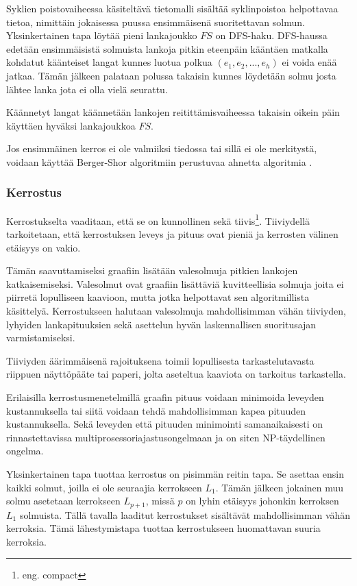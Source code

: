 \documentclass[finnish,12pt]{article}
\begin{document}
Syklien poistovaiheessa käsiteltävä tietomalli sisältää syklinpoistoa helpottavaa tietoa, nimittäin jokaisessa puussa ensimmäisenä suoritettavan solmun.
Yksinkertainen tapa löytää pieni lankajoukko $FS$ on DFS-haku.
DFS-haussa edetään ensimmäisistä solmuista lankoja pitkin eteenpäin kääntäen matkalla kohdatut käänteiset langat kunnes luotua polkua $(e_1,e_2, ..., e_h)$ ei voida enää jatkaa.
Tämän jälkeen palataan polussa takaisin kunnes löydetään solmu josta lähtee lanka jota ei olla vielä seurattu.
\cite{RefWorks:69}

Käännetyt langat käännetään lankojen reitittämisvaiheessa takaisin oikein päin käyttäen hyväksi lankajoukkoa $FS$.

Jos ensimmäinen kerros ei ole valmiiksi tiedossa tai sillä ei ole merkitystä, voidaan käyttää Berger-Shor algoritmiin \cite{RefWorks:68} perustuvaa ahnetta algoritmia \cite{RefWorks:48}.

		\subsubsection{Kerrostus}

Kerrostukselta vaaditaan, että se on kunnollinen sekä tiivis\footnote{eng. compact}.
Tiiviydellä tarkoitetaan, että kerrostuksen leveys ja pituus ovat pieniä ja kerrosten välinen etäisyys on vakio. 

Tämän saavuttamiseksi graafiin lisätään valesolmuja pitkien lankojen katkaisemiseksi.
Valesolmut ovat graafiin lisättäviä kuvitteellisia solmuja joita ei piirretä lopulliseen kaavioon, mutta jotka helpottavat sen algoritmillista käsittelyä.
Kerrostukseen halutaan valesolmuja mahdollisimman vähän tiiviyden, lyhyiden lankapituuksien sekä asettelun hyvän laskennallisen suoritusajan varmistamiseksi.

Tiiviyden äärimmäisenä rajoituksena toimii lopullisesta tarkastelutavasta riippuen näyttöpääte tai paperi, jolta aseteltua kaaviota on tarkoitus tarkastella.

Erilaisilla kerrostusmenetelmillä graafin pituus voidaan minimoida leveyden kustannuksella tai siitä voidaan tehdä mahdollisimman kapea pituuden kustannuksella.
Sekä leveyden että pituuden minimointi samanaikaisesti on rinnastettavissa multiprosessoriajastusongelmaan ja on siten NP-täydellinen ongelma. \cite{RefWorks:39}

Yksinkertainen tapa tuottaa kerrostus on pisimmän reitin tapa. Se asettaa ensin kaikki solmut, joilla ei ole seuraajia kerrokseen $L_1$.
Tämän jälkeen jokainen muu solmu asetetaan kerrokseen $L_{p+1}$, missä $p$ on lyhin etäisyys johonkin kerroksen $L_1$ solmuista.
Tällä tavalla laaditut kerrostukset sisältävät mahdollisimman vähän kerroksia.
Tämä lähestymistapa tuottaa kerrostukseen huomattavan suuria kerroksia.
\end{document}
